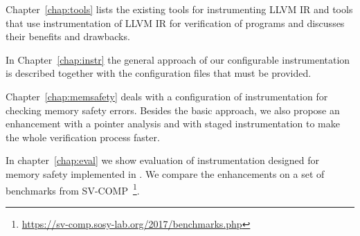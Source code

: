 Chapter~\ref{chap:tools} lists the existing tools for instrumenting LLVM IR and
tools that use instrumentation of LLVM IR for verification of programs and
discusses their benefits and drawbacks.

In Chapter~\ref{chap:instr} the general approach of our configurable
instrumentation is described together with the configuration files that must
be provided.

Chapter~\ref{chap:memsafety} deals with a configuration of instrumentation for
checking memory safety errors. Besides the basic approach, we also propose an
enhancement with a pointer analysis and with staged instrumentation to make the
whole verification process faster.

In chapter~\ref{chap:eval} we show evaluation of instrumentation designed for
memory safety implemented in \symbiotic. We compare the enhancements on a
set of benchmarks from
SV-COMP~\footnote{\url{https://sv-comp.sosy-lab.org/2017/benchmarks.php}}.


